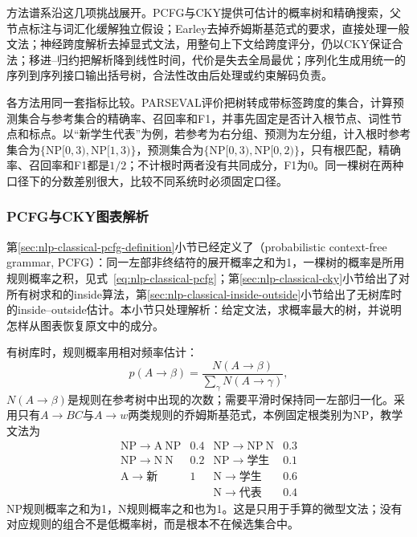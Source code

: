 方法谱系沿这几项挑战展开。PCFG与CKY提供可估计的概率树和精确搜索，父节点标注与词汇化缓解独立假设；Earley去掉乔姆斯基范式的要求，直接处理一般文法；神经跨度解析去掉显式文法，用整句上下文给跨度评分，仍以CKY保证合法；移进--归约把解析降到线性时间，代价是失去全局最优；序列化生成用统一的序列到序列接口输出括号树，合法性改由后处理或约束解码负责。

各方法用同一套指标比较。PARSEVAL评价把树转成带标签跨度的集合，计算预测集合与参考集合的精确率、召回率和F1，并事先固定是否计入根节点、词性节点和标点。以“新学生代表”为例，若参考为右分组、预测为左分组，计入根时参考集合为$\{\mathrm{NP}[0,3),\mathrm{NP}[1,3)\}$，预测集合为$\{\mathrm{NP}[0,3),\mathrm{NP}[0,2)\}$，只有根匹配，精确率、召回率和F1都是$1/2$；不计根时两者没有共同成分，F1为0。同一棵树在两种口径下的分数差别很大，比较不同系统时必须固定口径。

\subsubsection{PCFG与CKY图表解析}
\label{sec:nlp-analysis-pcfg-cky}

第\ref{sec:nlp-classical-pcfg-definition}小节已经定义了（probabilistic context-free grammar, PCFG）：同一左部非终结符的展开概率之和为1，一棵树的概率是所用规则概率之积，见式~\eqref{eq:nlp-classical-pcfg}；第\ref{sec:nlp-classical-cky}小节给出了对所有树求和的inside算法，第\ref{sec:nlp-classical-inside-outside}小节给出了无树库时的inside--outside估计。本小节只处理解析：给定文法，求概率最大的树，并说明怎样从图表恢复原文中的成分。

有树库时，规则概率用相对频率估计：
\[
 p(A\to\beta)=\frac{N(A\to\beta)}{\sum_{\gamma}N(A\to\gamma)},
\]
$N(A\to\beta)$是规则在参考树中出现的次数；需要平滑时保持同一左部归一化。采用只有$A\to BC$与$A\to w$两类规则的乔姆斯基范式，本例固定根类别为NP，教学文法为
\[
\begin{array}{llll}
 \mathrm{NP}\to\mathrm A\ \mathrm{NP}&0.4&
 \mathrm{NP}\to\mathrm{NP}\ \mathrm N&0.3\\
 \mathrm{NP}\to\mathrm N\ \mathrm N&0.2&
 \mathrm{NP}\to\text{学生}&0.1\\
 \mathrm A\to\text{新}&1&
 \mathrm N\to\text{学生}&0.6\\
 &&\mathrm N\to\text{代表}&0.4
\end{array}
\]
NP规则概率之和为1，N规则概率之和也为1。这是只用于手算的微型文法；没有对应规则的组合不是低概率树，而是根本不在候选集合中。

